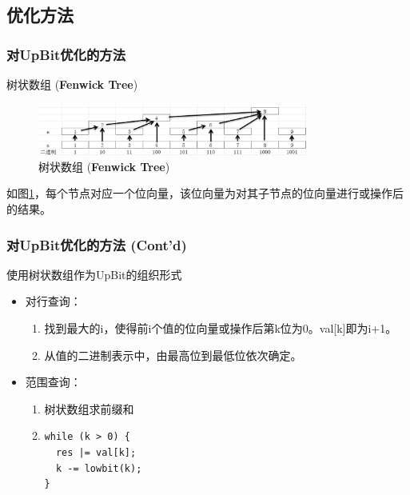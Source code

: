 \documentclass[hyperref={unicode=true}]{beamer}
\begin{document}
\subsection{优化方法}
\begin{frame}\frametitle{对UpBit优化的方法}
  \begin{block}{树状数组 ({\bf Fenwick Tree})}
    \begin{figure}[H]
      \begin{center}
        \includegraphics[width=3.5in]{bit.png}
        \caption{树状数组 ({\bf Fenwick Tree})}\label{fig:bit}
      \end{center}
    \end{figure}
    如图\ref{fig:bit}，每个节点对应一个位向量，该位向量为对其子节点的位向量进行或操作后的结果。
  \end{block}
\end{frame}
\begin{frame}[fragile]\frametitle{对UpBit优化的方法 (Cont'd)}
  \begin{block}{使用树状数组作为UpBit的组织形式}
    \begin{itemize}
    \item 对行查询：\\
      \begin{enumerate}[1.]
      \item 找到最大的i，使得前i个值的位向量或操作后第k位为0。val[k]即为i+1。
      \item 从值的二进制表示中，由最高位到最低位依次确定。
      \end{enumerate}
    \item 范围查询：\\
      \begin{enumerate}[1.]
      \item 树状数组求前缀和
      \item \begin{verbatim}
while (k > 0) {
  res |= val[k];
  k -= lowbit(k);
}
      \end{verbatim}
      \end{enumerate}
    \end{itemize}
  \end{block}
\end{frame}
\end{document}
